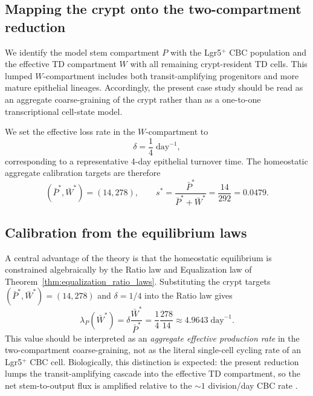 \documentclass[pdflatex,sn-mathphys-ay]{sn-jnl}
\theoremstyle{thmstyleone}
\theoremstyle{definition}
\theoremstyle{remark}
\begin{document}
\subsection{Mapping the crypt onto the two-compartment reduction}
\label{subsec:crypt_mapping}

We identify the model stem compartment $P$ with the Lgr5$^+$ CBC population and the
effective TD compartment $W$ with all remaining crypt-resident TD cells.
This lumped $W$-compartment includes both transit-amplifying progenitors and more mature
epithelial lineages. Accordingly, the present case study should be read as an aggregate
coarse-graining of the crypt rather than as a one-to-one transcriptional cell-state model.

We set the effective loss rate in the $W$-compartment to
\[
\delta=\frac{1}{4}\;\mathrm{day}^{-1},
\]
corresponding to a representative 4-day epithelial turnover time. The homeostatic
aggregate calibration targets are therefore
\[
(\bar P^*,\bar W^*)=(14,278),
\qquad
s^*=\frac{\bar P^*}{\bar P^*+\bar W^*}=\frac{14}{292}=0.0479.
\]

\subsection{Calibration from the equilibrium laws}
\label{subsec:crypt_calibration}

A central advantage of the theory is that the homeostatic equilibrium is constrained
algebraically by the Ratio law and Equalization law of
Theorem~\ref{thm:equalization_ratio_laws}. Substituting the crypt targets
$(\bar P^*,\bar W^*)=(14,278)$ and $\delta=1/4$ into the Ratio law gives
\[
\lambda_P(\bar W^*)=\delta\frac{\bar W^*}{\bar P^*}
=\frac14\frac{278}{14}\approx 4.9643\;\mathrm{day}^{-1}.
\]
This value should be interpreted as an \emph{aggregate effective production rate} in the
two-compartment coarse-graining, not as the literal single-cell cycling rate of an
Lgr5$^+$ CBC cell. Biologically, this distinction is expected: the present reduction
lumps the transit-amplifying cascade into the effective TD compartment, so the
net stem-to-output flux is amplified relative to the $\sim1$ division/day CBC rate
\citep{snippert_intestinal_2010}.
\end{document}
